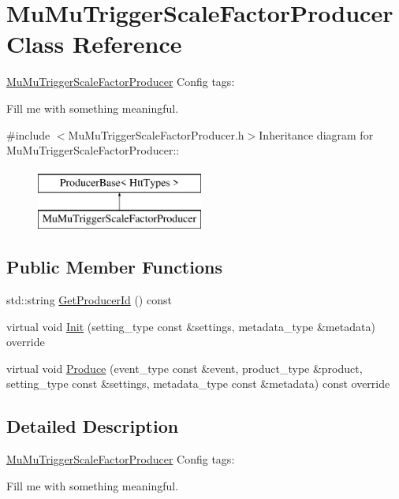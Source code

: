 \hypertarget{classMuMuTriggerScaleFactorProducer}{
\section{MuMuTriggerScaleFactorProducer Class Reference}
\label{classMuMuTriggerScaleFactorProducer}
}


\hyperlink{classMuMuTriggerScaleFactorProducer}{MuMuTriggerScaleFactorProducer} Config tags:
\begin{DoxyItemize}
\item Fill me with something meaningful. 
\end{DoxyItemize} 


{\ttfamily \#include $<$MuMuTriggerScaleFactorProducer.h$>$}Inheritance diagram for MuMuTriggerScaleFactorProducer::\begin{figure}[H]
\begin{center}
\leavevmode
\includegraphics[height=2cm]{classMuMuTriggerScaleFactorProducer}
\end{center}
\end{figure}
\subsection*{Public Member Functions}
\begin{DoxyCompactItemize}
\item 
std::string \hyperlink{classMuMuTriggerScaleFactorProducer_acd99ea5ee1f73fd6d3f27a357cc931bd}{GetProducerId} () const 
\item 
virtual void \hyperlink{classMuMuTriggerScaleFactorProducer_a27f1627a3f301b3ff208953eda6f3590}{Init} (setting\_\-type const \&settings, metadata\_\-type \&metadata) override
\item 
virtual void \hyperlink{classMuMuTriggerScaleFactorProducer_acde0cb3f29fdd6e71f6cc2b434b2f079}{Produce} (event\_\-type const \&event, product\_\-type \&product, setting\_\-type const \&settings, metadata\_\-type const \&metadata) const override
\end{DoxyCompactItemize}


\subsection{Detailed Description}
\hyperlink{classMuMuTriggerScaleFactorProducer}{MuMuTriggerScaleFactorProducer} Config tags:
\begin{DoxyItemize}
\item Fill me with something meaningful. 
\end{DoxyItemize}


